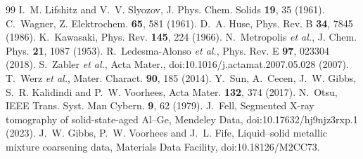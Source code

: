 \documentclass[11pt,a4paper]{article}
\begin{document}
\begin{thebibliography}{99}\small
{} I.~M. Lifshitz and V.~V. Slyozov, J. Phys. Chem. Solids \textbf{19}, 35 (1961).
 C.~Wagner, Z. Elektrochem. \textbf{65}, 581 (1961).
 D.~A. Huse, Phys. Rev. B \textbf{34}, 7845 (1986).
 K.~Kawasaki, Phys. Rev. \textbf{145}, 224 (1966).
 N.~Metropolis \emph{et al.}, J. Chem. Phys. \textbf{21}, 1087 (1953).
 R.~Ledesma-Alonso \emph{et al.}, Phys. Rev. E \textbf{97}, 023304 (2018).
 S.~Zabler \emph{et al.}, Acta Mater., doi:10.1016/j.actamat.2007.05.028 (2007).
 T.~Werz \emph{et al.}, Mater. Charact. \textbf{90}, 185 (2014).
 Y.~Sun, A.~Cecen, J.~W. Gibbs, S.~R. Kalidindi and P.~W. Voorhees, Acta Mater. \textbf{132}, 374 (2017).
 N.~Otsu, IEEE Trans. Syst. Man Cybern. \textbf{9}, 62 (1979).
 J.~Fell, Segmented X-ray tomography of solid-state-aged Al--Ge, Mendeley Data, doi:10.17632/hj9njz3rxp.1 (2023).
 J.~W. Gibbs, P.~W. Voorhees and J.~L. Fife, Liquid--solid metallic mixture coarsening data, Materials Data Facility, doi:10.18126/M2CC73.
\end{thebibliography}
\end{document}
